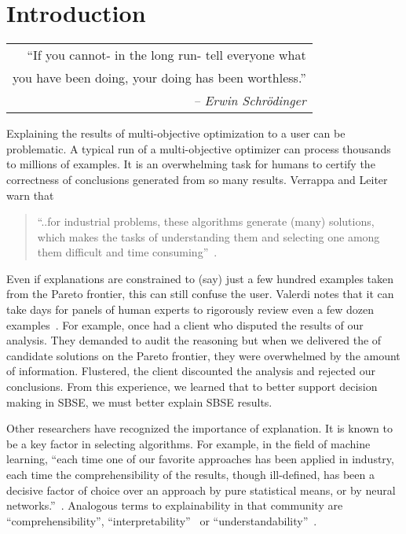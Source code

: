 \documentclass[runningheads]{llncs}
\makeatletter
\newenvironment{myepigraph}
  {\par\hfill\itshape
   \begin{tabular}{@{}r@{}}} %
  {\end{tabular}\par\medskip}
\makeatother
\begin{document}
\section{Introduction}

\begin{myepigraph}
``If you cannot- in the long run- tell  everyone what \\
 you have been doing, your  doing has been worthless.''\\
 {\em-- Erwin Schr\"odinger}

\end{myepigraph}


Explaining the results of
multi-objective optimization to a user
can be problematic.
A typical run of a multi-objective optimizer
can process thousands to millions of examples.
It is an overwhelming task for humans to
certify the correctness of conclusions generated
from so many results. Verrappa and Leiter warn that
\begin{quote}
``..for industrial problems, these algorithms generate
(many) solutions, which makes the tasks of
understanding them and selecting one among them
difficult and time consuming''~\cite{veer11}.
\end{quote}
Even if explanations are constrained to
 (say) just a few hundred examples taken from the Pareto
frontier, this can still confuse the user.
 Valerdi notes that it can take days for
panels of human experts to rigorously review even a few dozen
examples~\cite{valerdi11}.  
For example, once had a 
client who disputed the results of our  analysis.
They
demanded to  audit the reasoning but
 when we delivered the 
of candidate solutions on the Pareto frontier,
they were overwhelmed by
the amount of information.  Flustered,
the client discounted the  analysis
and rejected our conclusions. From this experience, we learned that
to better support decision making in SBSE, we must better explain
SBSE results.

Other researchers have recognized the importance
of explanation.
It is known to be a key factor in selecting algorithms.
For example, in the field of machine learning,
``each time one of our favorite 
approaches has been applied in industry, each time the
comprehensibility of the results, though ill-defined, has
been a decisive factor of choice over an approach by pure
statistical means, or by neural networks.''~\cite{ag98}.
Analogous terms to explainability  in that community 
are ``comprehensibility'',
``interpretability''~\cite{maimon05} or ``understandability''~\cite{allahyari:user-oriented}.
\end{document}
